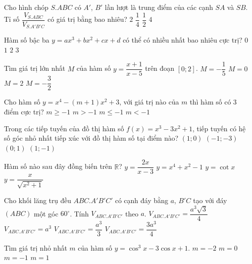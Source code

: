 \begin{ex}%
Cho hình chóp $S.ABC$ có $A'$, $B'$ lần lượt là trung điểm của các cạnh $SA$ và $SB$. Tỉ số $\dfrac{V_{S.ABC}}{V_{S.A'B'C}}$ có giá trị bằng bao nhiêu?
\choice
{$2$}
{\True $\dfrac{1}{4}$}
{$\dfrac{1}{2}$}
{$4$}
\end{ex}
\begin{ex}%
Hàm số bậc ba $y=ax^3+bx^2+cx+d$ có thể có nhiều nhất bao nhiêu cực trị?
\choice
{$0$}
{$1$}
{\True $2$}
{$3$}
\end{ex}
\begin{ex}%
Tìm giá trị lớn nhất $M$ của hàm số $y=\dfrac{x+1}{x-5}$ trên đoạn $[0;2]$.
\choice
{\True $M=-\dfrac{1}{5}$}
{$M=0$}
{$M=2$}
{$M=-\dfrac{3}{2}$}
\end{ex}
\begin{ex}%
Cho hàm số $y=x^4-(m+1)x^2+3$, với giá trị nào của $m$ thì hàm số có $3$ điểm cực trị?
\choice
{$m\ge-1$}
{\True $m>-1$}
{$m\le-1$}
{$m<-1$}
\end{ex}
\begin{ex}%
Trong các tiếp tuyến của đồ thị hàm số $f(x)=x^3-3x^2+1$, tiếp tuyến có hệ số góc nhỏ nhất tiếp xúc với đồ thị hàm số tại điểm nào?
\choice
{$(1;0)$}
{$(-1;-3)$}
{$(0;1)$}
{\True $(1;-1)$}
\end{ex}
\begin{ex}%
Hàm số nào sau đây đồng biến trên $\mathbb{R}$?
\choice
{$y=\dfrac{2x}{x-3}$}
{$y=x^4+x^2-1$}
{$y=\cot x$}
{\True $y=\dfrac{x}{\sqrt{x^2+1}}$}
\end{ex}
\begin{ex}%
Cho khối lăng trụ đều $ABC.A'B'C'$ có cạnh đáy bằng $a$, $B'C$ tạo với đáy $(ABC)$ một góc $60^\circ$. Tính $V_{ABC.A'B'C'}$ theo $a$.
\choice
{$V_{ABC.A'B'C'}=\dfrac{a^3\sqrt{3}}{4}$}
{$V_{ABC.A'B'C'}=a^3$}
{$V_{ABC.A'B'C'}=\dfrac{a^3}{3}$}
{\True $V_{ABC.A'B'C'}=\dfrac{3a^3}{4}$}
\end{ex}
\begin{ex}%
Tìm giá trị nhỏ nhất $m$ của hàm số $y=\cos^3 x-3\cos x+1$.
\choice
{$m=-2$}
{$m=0$}
{\True $m=-1$}
{$m=1$}
\end{ex}
